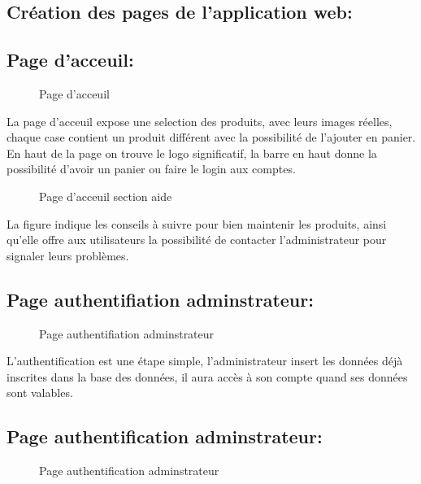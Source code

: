 \documentclass[a4paper]{report}
\begin{document}
\begin{doublespace}
	\section{Création des pages de l'application web:}
	\subsection{Page d'acceuil:}
	\begin{figure}[H]
		\begin{center}
			\caption{Page d'acceuil}
		\end{center}
	\end{figure}
	\newpage
	La page d'acceuil expose une selection des produits,
	avec leurs images réelles, chaque case contient un produit différent avec la
	possibilité de l'ajouter en panier. En haut de la page on trouve le logo
	significatif, la barre en haut donne la possibilité d'avoir un panier ou faire
	le login aux comptes.
	\begin{figure}[H]
		\begin{center}
			\caption{Page d'acceuil section aide }
		\end{center}
	\end{figure}
	La figure indique les conseils à suivre pour bien
	maintenir les produits, ainsi qu'elle offre aux utilisateurs la possibilité de
	contacter l'administrateur pour signaler leurs problèmes.
	\subsection{Page authentifiation adminstrateur:}
	\begin{figure}[H]
		\begin{center}
			\caption{Page authentifiation adminstrateur}
		\end{center}
	\end{figure}
	L’authentification est une étape simple,
	l'administrateur insert les données déjà inscrites dans la base des données, il
	aura accès à son compte quand ses données sont valables.
	\subsection{Page authentification adminstrateur:}
	\begin{figure}[H]
		\begin{center}
			\caption{Page authentification adminstrateur}
		\end{center}
	\end{figure}

\end{doublespace}
\end{document}
